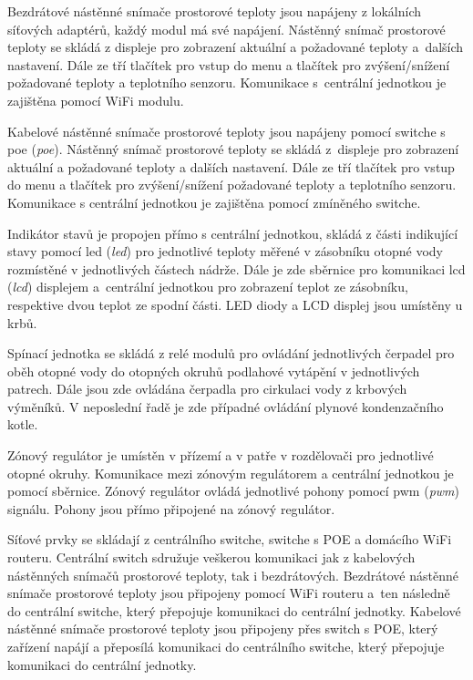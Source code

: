 Bezdrátové nástěnné snímače prostorové teploty jsou napájeny z lokálních síťových adaptérů, každý modul má své napájení. Nástěnný snímač prostorové teploty se skládá z displeje pro zobrazení aktuální a požadované teploty a~dalších nastavení. Dále ze tří tlačítek pro vstup do menu a tlačítek pro zvýšení/snížení požadované teploty a teplotního senzoru. Komunikace s~centrální jednotkou je zajištěna pomocí WiFi modulu.

Kabelové nástěnné snímače prostorové teploty jsou napájeny pomocí switche s  \acrshort{poe} (\textit{\acrlong{poe}}). Nástěnný snímač prostorové teploty se skládá z~displeje pro zobrazení aktuální a požadované teploty a dalších nastavení. Dále ze tří tlačítek pro vstup do menu a tlačítek pro zvýšení/snížení požadované teploty a teplotního senzoru. Komunikace s centrální jednotkou je zajištěna pomocí zmíněného switche.

Indikátor stavů je propojen přímo s centrální jednotkou, skládá z části indikující stavy pomocí \acrshort{led} (\textit{\acrlong{led}}) pro jednotlivé teploty měřené v zásobníku otopné vody rozmístěné v jednotlivých částech nádrže. Dále je zde sběrnice pro komunikaci \acrshort{lcd} (\textit{\acrlong{lcd}}) displejem a~centrální jednotkou pro zobrazení teplot ze zásobníku, respektive dvou teplot ze spodní části. LED diody a LCD displej jsou umístěny u krbů.

Spínací jednotka se skládá z relé modulů pro ovládání jednotlivých čerpadel pro oběh otopné vody do otopných okruhů podlahové vytápění v jednotlivých patrech. Dále jsou zde ovládána čerpadla pro cirkulaci vody z krbových výměníků. V neposlední řadě je zde případné ovládání plynové kondenzačního kotle.

Zónový regulátor je umístěn v přízemí a v patře v rozdělovači pro jednotlivé otopné okruhy. Komunikace mezi zónovým regulátorem a centrální jednotkou je pomocí sběrnice. Zónový regulátor ovládá jednotlivé pohony pomocí \acrshort{pwm} (\textit{\acrlong{pwm}}) signálu. Pohony jsou přímo připojené na zónový regulátor.

Síťové prvky se skládají z centrálního switche, switche s POE a domácího WiFi routeru. Centrální switch sdružuje veškerou komunikaci jak z kabelových nástěnných snímačů prostorové teploty, tak i bezdrátových. Bezdrátové nástěnné snímače prostorové teploty jsou připojeny pomocí WiFi routeru a~ten následně do centrální switche, který přepojuje komunikaci do centrální jednotky. Kabelové nástěnné snímače prostorové teploty jsou připojeny přes switch s POE, který zařízení napájí a přeposílá komunikaci do centrálního switche, který přepojuje komunikaci do centrální jednotky.

